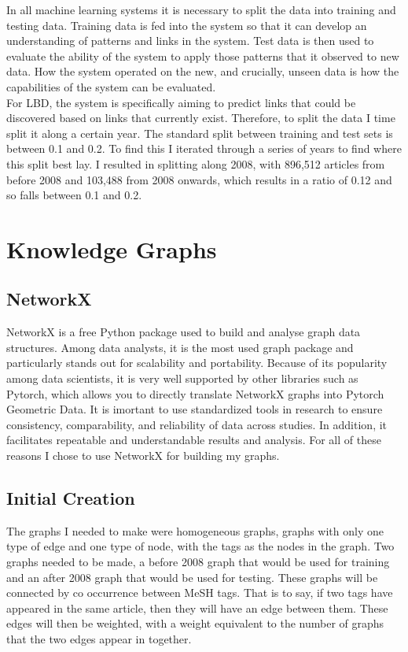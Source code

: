 \documentclass{l4proj}
\begin{document}
In all machine learning systems it is necessary to split the data into training and testing data. Training data is fed into the system so that it can develop an understanding of patterns and links in the system. Test data is then used to evaluate the ability of the system to apply those patterns that it observed to new data. How the system operated on the new, and crucially, unseen data is how the capabilities of the system can be evaluated. \\

For LBD, the system is specifically aiming to predict links that could be discovered based on links that currently exist. Therefore, to split the data I time split it along a certain year. The standard split between training and test sets is between 0.1 and 0.2. To find this I iterated through a series of years to find where this split best lay. I resulted in splitting along 2008, with 896,512 articles from before 2008 and 103,488 from 2008 onwards, which results in a ratio of 0.12 and so falls between 0.1 and 0.2. \\

\section{Knowledge Graphs}

\subsection{NetworkX}

NetworkX is a free Python package used to build and analyse graph data structures. Among data analysts, it is the most used graph package and particularly stands out for scalability and portability. Because of its popularity among data scientists, it is very well supported by other libraries such as Pytorch, which allows you to directly translate NetworkX graphs into Pytorch Geometric Data. It is imortant to use standardized tools in research to ensure consistency, comparability, and reliability of data across studies. In addition, it  facilitates repeatable and understandable results and analysis. For all of these reasons I chose to use NetworkX for building my graphs. \\

\subsection{Initial Creation}

The graphs I needed to make were homogeneous graphs, graphs with only one type of edge and one type of node, with the tags as the nodes in the graph. Two graphs needed to be made, a before 2008 graph that would be used for training and an after 2008 graph that would be used for testing. These graphs will be connected by co occurrence between MeSH tags. That is to say, if two tags have appeared in the same article, then they will have an edge between them. These edges will then be weighted, with a weight equivalent to the number of graphs that the two edges appear in together. \\
\end{document}
